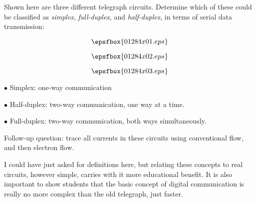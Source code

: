 

Shown here are three different telegraph circuits.  Determine which of these could be classified as {\it simplex}, {\it full-duplex}, and {\it half-duplex}, in terms of serial data transmission:

$$\epsfbox{01284x01.eps}$$

$$\epsfbox{01284x02.eps}$$

$$\epsfbox{01284x03.eps}$$







\medskip
\item{$\bullet$} Simplex: one-way communication
\item{$\bullet$} Half-duplex: two-way communication, one way at a time.
\item{$\bullet$} Full-duplex: two-way communication, both ways simultaneously.
\medskip

\vskip 10pt

Follow-up question: trace all currents in these circuits using conventional flow, and then electron flow.







I could have just asked for definitions here, but relating these concepts to real circuits, however simple, carries with it more educational benefit.  It is also important to show students that the basic concept of digital communication is really no more complex than the old telegraph, just faster.




